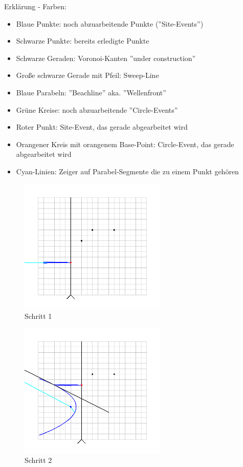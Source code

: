 Erklärung - Farben:
\begin{itemize}
\item Blaue Punkte: noch abzuarbeitende Punkte (''Site-Events'')
\item Schwarze Punkte: bereits erledigte Punkte
\item Schwarze Geraden: Voronoi-Kanten ''under construction''
\item Große schwarze Gerade mit Pfeil: Sweep-Line
\item Blaue Parabeln: ''Beachline'' aka. ''Wellenfront''
\item Grüne Kreise: noch abzuarbeitende ''Circle-Events''
\item Roter Punkt: Site-Event, das gerade abgearbeitet wird
\item Orangener Kreis mit orangenem Base-Point: Circle-Event, das gerade abgearbeitet wird
\item Cyan-Linien: Zeiger auf Parabel-Segmente die zu einem Punkt gehören
\end{itemize}

\begin{figure}[h]
\begin{center}
\includegraphics[width=7cm]{capture1}
\end{center}
\caption{Schritt 1}
\label{fig:c1}
\end{figure}

\begin{figure}[h]
\begin{center}
\includegraphics[width=7cm]{capture2}
\end{center}
\caption{Schritt 2}
\label{fig:c2}
\end{figure}


